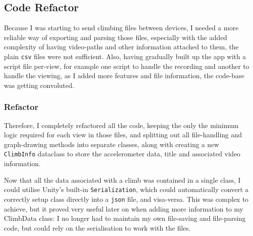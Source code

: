 \subsection{Code Refactor}
Because I was starting to send climbing files between devices, I needed a more reliable way of exporting and parsing those files, especially with the added complexity of having video-paths and other information attached to them, the plain \verb|csv| files were not sufficient.
Also, having gradually built up the app with a script file per-view, for example one script to handle the recording and another to handle the viewing, as I added more features and file information, the code-base was getting convoluted.


\subsubsection{Refactor}
Therefore, I completely refactored all the code, keeping the only the minimum logic required for each view in those files, and splitting out all file-handling and graph-drawing methods into separate classes, along with creating a new \verb|ClimbInfo| dataclass to store the accelerometer data, title and associated video information.

Now that all the data associated with a climb was contained in a single class, I could utilise Unity's built-in \verb|Serialization|, which could automatically convert a correctly setup class directly into a \verb|json| file, and visa-versa. 
This was complex to achieve, but it proved very useful later on when adding more information to my ClimbData class: I no longer had to maintain my own file-saving and file-parsing code, but could rely on the serialisation to work with the files.


